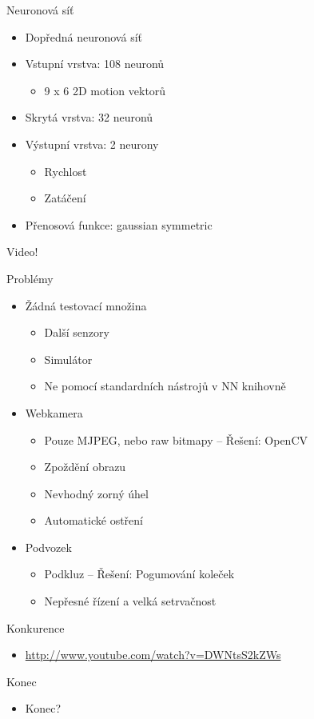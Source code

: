 \documentclass{beamer}
\begin{document}
\begin{frame}{Neuronová síť}
\begin{itemize}
\item Dopředná neuronová síť
\item Vstupní vrstva: 108 neuronů
	\begin{itemize}
	\item 9 x 6 2D motion vektorů
	\end{itemize}
\item Skrytá vrstva: 32 neuronů
\item Výstupní vrstva: 2 neurony
	\begin{itemize}
	\item Rychlost
	\item Zatáčení
	\end{itemize}
\item Přenosová funkce: gaussian symmetric
\end{itemize}
\end{frame}

{

\begin{frame}[plain]
\begin{centering}
Video!
\end{centering}
\end{frame}

}

\begin{frame}{Problémy}
\begin{itemize}
\item Žádná testovací množina
	\begin{itemize}
	\item Další senzory
	\item Simulátor
	\item Ne pomocí standardních nástrojů v NN knihovně
	\end{itemize}
\item Webkamera
	\begin{itemize}
	\item Pouze MJPEG, nebo raw bitmapy -- Řešení: OpenCV
	\item Zpoždění obrazu
	\item Nevhodný zorný úhel
	\item Automatické ostření
	\end{itemize}
\item Podvozek
	\begin{itemize}
	\item Podkluz -- Řešení: Pogumování koleček
	\item Nepřesné řízení a velká setrvačnost
	\end{itemize}
\end{itemize}
\end{frame}

\begin{frame}{Konkurence}
\begin{itemize}
\item \url{http://www.youtube.com/watch?v=DWNtsS2kZWs}
\end{itemize}
\end{frame}

\begin{frame}{Konec}
\begin{itemize}
\item Konec?
\end{itemize}
\end{frame}
\end{document}
